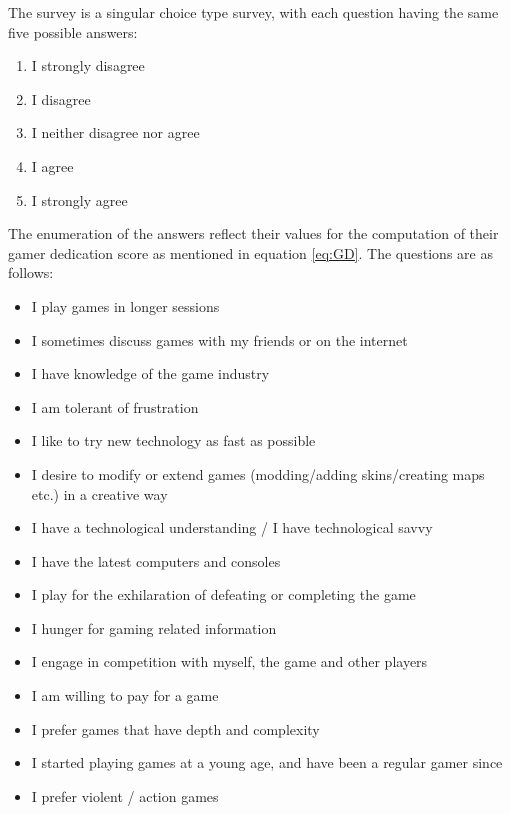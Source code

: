 The survey is a singular choice type survey, with each question having the same five possible answers:

\begin{enumerate}
\item I strongly disagree
\item I disagree
\item I neither disagree nor agree
\item I agree
\item I strongly agree
\end{enumerate}
The enumeration of the answers reflect their values for the computation of their gamer dedication score as mentioned in equation \ref{eq:GD}.
The questions are as follows:

\begin{itemize}
\item I play games in longer sessions
\item I sometimes discuss games with my friends or on the internet
\item I have knowledge of the game industry
\item I am tolerant of frustration
\item I like to try new technology as fast as possible
\item I desire to modify or extend games (modding/adding skins/creating maps etc.) in a creative way
\item I have a technological understanding / I have technological savvy
\item I have the latest computers and consoles
\item I play for the exhilaration of defeating or completing the game
\item I hunger for gaming related information
\item I engage in competition with myself, the game and other players
\item I am willing to pay for a game
\item I prefer games that have depth and complexity
\item I started playing games at a young age, and have been a regular gamer since
\item I prefer violent / action games
\end{itemize}